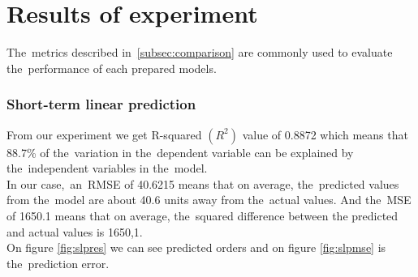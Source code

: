 \section{Results of experiment}\label{subsec:experimentResults}
    The~metrics described in~\ref{subsec:comparison} are commonly used to evaluate
     the~performance of each prepared models.
    \subsubsection{Short-term linear prediction} \label{subsec:res_slp}
    From our experiment we get R-squared $(R^2)$ value of 0.8872 which means that
    88.7\% of the~variation in the~dependent variable can be explained
    by the~independent variables in the~model.\\
    In our case,~an~RMSE of 40.6215 means that on average, the~predicted values
    from the~model are about 40.6 units away from the~actual values.
    And the~MSE of 1650.1 means that on average, the~squared difference between the
    predicted and actual values is 1650,1.\\
    On figure \ref{fig:slpres} we can see predicted orders and on figure \ref{fig:slpmse}
    is the~prediction error. 
